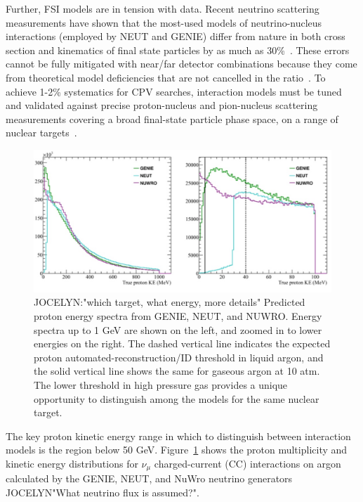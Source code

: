 Further, FSI models are in tension with data.  
Recent neutrino scattering measurements have shown that the most-used models of neutrino-nucleus interactions (employed by NEUT and GENIE) differ from nature in both cross section and kinematics of final state particles by as much as 30\%~\cite{Wascko:2009cn,Wascko:2011hy}. 
These errors cannot be fully mitigated with near/far detector combinations because they come from theoretical model deficiencies that are not cancelled in the ratio~\cite{Coloma:2013rqa}. 
To achieve 1-2\% systematics for CPV searches, interaction models must be tuned and validated against precise proton-nucleus and pion-nucleus scattering measurements covering a broad final-state particle phase space, on a range of nuclear targets~\cite{Cao:2014zra}.

\begin{figure}%
    \centering
    \includegraphics[width=12cm]{files/Figures/protons_from_argon.jpeg}%
    \caption{JOCELYN:"which target, what energy, more details" Predicted proton energy spectra from GENIE, NEUT, and NUWRO. Energy spectra up to 1 GeV are shown on the left, and zoomed in to lower energies on the right. The dashed vertical line indicates the expected proton automated-reconstruction/ID threshold in liquid argon, and the solid vertical line shows the same for gaseous argon at 10 atm. The lower threshold in high pressure gas provides a unique opportunity to distinguish among the models for the same nuclear target.}
    \label{fig:protonsfromargon}%
\end{figure}
The key proton kinetic energy range in which to distinguish between interaction models is the region below 50 GeV.
Figure~\ref{fig:protonsfromargon} shows the proton multiplicity and kinetic energy distributions for $\nu_{\mu}$ charged-current (CC) interactions on argon calculated by the GENIE, NEUT, and NuWro neutrino generators JOCELYN"What neutrino flux is assumed?".  

